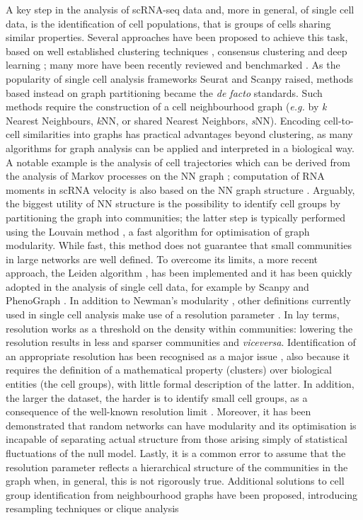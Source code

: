 \documentclass[10pt]{article}
\begin{document}
A key step in the analysis of scRNA-seq data and, more in general, of single cell data, is the identification of cell populations, that is groups of cells sharing similar properties. Several approaches have been proposed to achieve this task, based on well established clustering techniques \cite{wang_2017, lin_2017}, consensus clustering \cite{huh_2020, kiselev_2017, Ranjan_2021} and deep learning \cite{li_2020}; many more have been recently reviewed \cite{krzak_2019, kiselev_2019} and benchmarked \cite{du_2018}. As the popularity of single cell analysis frameworks Seurat \cite{butler_2018} and Scanpy \cite{wolf_2018} raised, methods based instead on graph partitioning became the \emph{de facto} standards. Such methods require the construction of a cell neighbourhood graph (\emph{e.g.} by \emph{k }Nearest Neighbours, \emph{k}NN, or shared Nearest Neighbors, \emph{s}NN). Encoding cell-to-cell similarities into graphs has practical advantages beyond clustering, as many algorithms for graph analysis can be applied and interpreted in a biological way. A notable example is the analysis of cell trajectories which can be derived from the analysis of Markov processes on the NN graph \cite{Setty_2019, Lange_2020} ; computation of RNA moments in scRNA velocity is also based on the NN graph structure \cite{Bergen_2020}. Arguably, the biggest utility of NN structure is the possibility to identify cell groups by partitioning the graph into communities; the latter step is typically performed using the Louvain method \cite{blondel_2008}, a fast algorithm for optimisation of graph modularity. While fast, this method does not guarantee that small communities in large networks are well defined. To overcome its limits, a more recent approach, the Leiden algorithm \cite{traag_2019}, has been implemented and it has been quickly adopted in the analysis of single cell data, for example by Scanpy \cite{wolf_2018} and PhenoGraph \cite{levine_2015}. In addition to Newman's modularity \cite{newman_2004}, other definitions currently used in single cell analysis make use of a resolution parameter \cite{traag_2011, reichardt_2006}. In lay terms, resolution works as a threshold on the density within communities: lowering the resolution results in less and sparser communities and \emph{viceversa}. Identification of an appropriate resolution has been recognised as a major issue \cite{lhnemann_2020}, also because it requires the definition of a mathematical property (clusters) over biological entities (the cell groups), with little formal description of the latter. In addition, the larger the dataset, the harder is to identify small cell groups, as a consequence of the well-known resolution limit \cite{fortunato_2007}. Moreover, it has been demonstrated that random networks can have modularity \cite{guimer_2004} and its optimisation is incapable of separating actual structure from those arising simply of statistical fluctuations of the null model. Lastly, it is a common error to assume that the resolution parameter reflects a hierarchical structure of the communities in the graph when, in general, this is not rigorously true. Additional solutions to cell group identification from neighbourhood graphs have been proposed, introducing resampling techniques \cite{baran_2019, Tang_Sackton_2020} or clique analysis 
\end{document}

